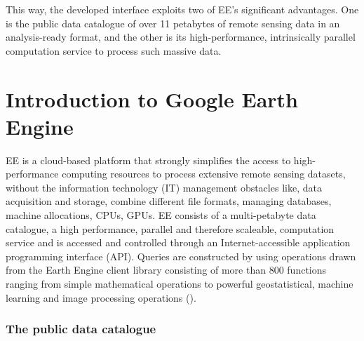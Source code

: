 This way, the developed interface exploits two of EE's significant advantages. One is the public data catalogue of over 11 petabytes of remote sensing data in an analysis-ready format, and the other is its high-performance, intrinsically parallel computation service to process such massive data.





\section{Introduction to Google Earth Engine}

EE is a cloud-based platform that strongly simplifies the access to high-performance computing resources to process extensive remote sensing datasets, without the information technology (IT) management obstacles like, data acquisition and storage, combine different file formats, managing databases, machine allocations, CPUs, GPUs. 
EE consists of a multi-petabyte data catalogue, a high performance, parallel and therefore scaleable, computation service and is accessed and controlled through an Internet-accessible application programming interface (API). Queries are constructed by using operations drawn from the Earth Engine client library consisting of more than 800 functions ranging from simple mathematical operations to powerful geostatistical, machine learning and image processing operations (\cite{gorelick2017google}).

\subsubsection{The public data catalogue}

